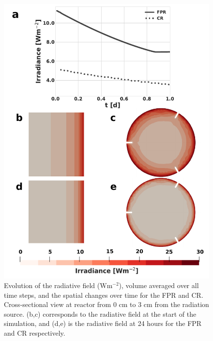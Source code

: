 \begin{figure}[ht]
\centering
\includegraphics[scale=0.75]{Images/Chap3/rad_field_dynamics.pdf}
\caption{Evolution of the radiative field ($\mathrm{W m^{-2}}$), volume averaged over all time steps, and the spatial changes over time for the FPR and CR. Cross-sectional view at reactor from 0 cm to 3 cm from the radiation source. (b,c) corresponds to the radiative field at the start of the simulation, and (d,e) is the radiative field at 24 hours for the FPR and CR respectively.}
\label{fig:rad_evol}
\end{figure}

